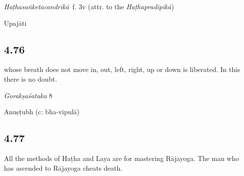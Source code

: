 \begin{ekdosis}
\begin{testimonia}[hp04_075]
\emph{Haṭhasaṅketacandrikā}~f. 3v (attr. to the \emph{Haṭhapradīpikā})
\begin{versinnote}
\tl{\var{rāja°] B220, rāva° 2244}\\!}
\end{versinnote}
\end{testimonia}


\begin{metre}[hp04_075]
Upajāti
\end{metre}

\subsection*{4.76}
\begin{translation} whose breath does not move in, out, left, right, up or down is liberated. In this there is no doubt.
\end{translation}

\begin{sources}[hp04_076]
\emph{Gorakṣaśataka} 8
\begin{versinnote}
\end{versinnote}
\end{sources}



\begin{metre}[hp04_076]
Anuṣṭubh (c: bha-vipulā)
\end{metre}

\subsection*{4.77}
\begin{translation}[hp04_077]
All the methods of Haṭha and Laya are for mastering Rājayoga. The man who has ascended to Rājayoga cheats death.
\end{translation}


\end{ekdosis}
